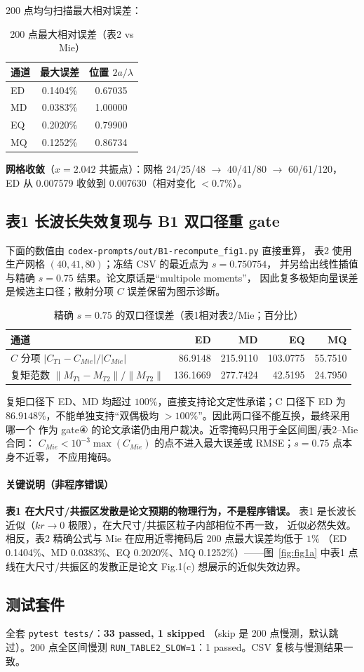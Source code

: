 200 点均匀扫描最大相对误差：

\begin{table}[H]
\centering
\caption{200 点最大相对误差（表2 vs Mie）}
\begin{tabular}{lcc}
\toprule
\textbf{通道} & \textbf{最大误差} & \textbf{位置 $2a/\lambda$} \\
\midrule
ED & 0.1404\% & 0.67035 \\
MD & 0.0383\% & 1.00000 \\
EQ & 0.2020\% & 0.79900 \\
MQ & 0.1252\% & 0.86734 \\
\bottomrule
\end{tabular}
\end{table}

\textbf{网格收敛}（$x=2.042$ 共振点）：网格 24/25/48 $\to$ 40/41/80 $\to$ 60/61/120，
ED 从 0.007579 收敛到 0.007630（相对变化 $<0.7\%$）。

\subsection{表1 长波长失效复现与 B1 双口径重 gate}

下面的数值由 \texttt{codex-prompts/out/B1-recompute\_fig1.py} 直接重算，
表2 使用生产网格 $(40,41,80)$；冻结 CSV 的最近点为 $s=0.750754$，
并另给出线性插值与精确 $s=0.75$ 结果。论文原话是“multipole moments”，
因此复多极矩向量误差是候选主口径；散射分项 $C$ 误差保留为图示诊断。

\begin{table}[H]
\centering
\caption{精确 $s=0.75$ 的双口径误差（表1相对表2/Mie；百分比）}
\begin{tabular}{lrrrr}
\toprule
通道 & ED & MD & EQ & MQ \\
\midrule
$C$ 分项 $|C_{T1}-C_{Mie}|/|C_{Mie}|$ & 86.9148 & 215.9110 & 103.0775 & 55.7510 \\
复矩范数 $\|M_{T1}-M_{T2}\|/\|M_{T2}\|$ & 136.1669 & 277.7424 & 42.5195 & 24.7950 \\
\bottomrule
\end{tabular}
\end{table}

复矩口径下 ED、MD 均超过 $100\%$，直接支持论文定性承诺；C 口径下 ED 为
$86.9148\%$，不能单独支持“双偶极均 $>100\%$”。因此两口径不能互换，最终采用哪一个
作为 gate④ 的论文承诺仍由用户裁决。近零掩码只用于全区间图/表2--Mie 合同：
$C_{Mie}<10^{-3}\max(C_{Mie})$ 的点不进入最大误差或 RMSE；$s=0.75$ 点本身不近零，
不应用掩码。

\paragraph{关键说明（非程序错误）}
\textbf{表1 在大尺寸/共振区发散是论文预期的物理行为，不是程序错误。}
表1 是长波长近似（$kr\to0$ 极限），在大尺寸/共振区粒子内部相位不再一致，
近似必然失效。相反，表2 精确公式与 Mie 在应用近零掩码后 200 点最大误差均低于 $1\%$
（ED 0.1404\%、MD 0.0383\%、EQ 0.2020\%、MQ 0.1252\%）——图~\ref{fig:fig1a}
中表1 点线在大尺寸/共振区的发散正是论文 Fig.1(c) 想展示的近似失效边界。

\subsection{测试套件}

全套 \texttt{pytest tests/}：\textbf{33 passed, 1 skipped}
（skip 是 200 点慢测，默认跳过）。200 点全区间慢测
\texttt{RUN\_TABLE2\_SLOW=1}：1 passed。CSV 复核与慢测结果一致。
